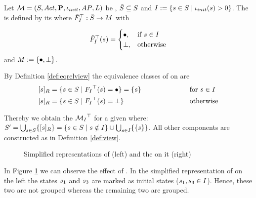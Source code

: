 \documentclass[preview]{standalone}
\begin{document}
\begin{definition}
	Let ${{{\mathcal{M}}}} = {{({S}, {Act}, {\textbf{P}}, {\iota_{init}}, {AP}, {L})}}$ be \achgphN, ${\tilde{{S}}} \subseteq {S}$ and ${I} := \{{s} \in {S} \mid {\iota_{init}}({s}) > 0\}$. The \viewN \viewinitstates is defined by its \grpfctN \gfctinitstates where ${{\tilde{F}_{{{I}}}}^{\top}} : {\tilde{{S}}} \to {\ensuremath{{M}}}$ with 
	
	\[
	{{\tilde{F}_{{{I}}}}^{\top}}({s}) =
	\begin{cases}
			{\bullet},				& \text{if } {s} \in {I} \\
			{\bot},     	& \text{otherwise}
		\end{cases}
	\]	
	and ${{M}} := {\{{\bullet}, {\bot}\}}$.
\end{definition}

\noindent By Definition \ref{def:eqrelview} the equivalence classes of \eqrelview on \states are 
\begin{alignat*}{3}
	\eqclassv &= \{\state \in \states \mid \gfctinitstates(\state) = \remelem\} = \{\state\} \quad\quad\quad\quad\quad\quad &&\text{for } \state \in \initstates \\
	\eqclassv &= \{\state \in \states \mid \gfctinitstates(\state) = \notppty \} &&\text{otherwise}
\end{alignat*}

\noindent Thereby we obtain the \viewN ${{{{{\mathcal{M}}}}_{{{I}}}}^{\top}}$ for a given \achgphN \chgph where: ${S}' = \bigcup_{{s} \in {S}} \{{{[{s}]_{{R}}}}\} = \{{s} \in {S} \mid {s} \notin {I}\}\cup \bigcup_{{s} \in {I}}\{\{{s}\}\}$. All other components are constructed as in Definition \ref{def:view}.

\begin{figure}[!htb]
	\begin{minipage}{.5\textwidth}
		\hspace{5mm}
		
	\end{minipage}%
	\begin{minipage}{.5\textwidth}
		
	\end{minipage}
	\caption{Simplified representations of \mdp (left) and the \viewN \viewinitstates on it (right)}
	\label{fig:initStatesExmp} 
\end{figure}

\begin{exmp}
	In Figure \ref{fig:initStatesExmp} we can observe the effect of \viewinitstates. In the simplified representation of \achgphN on the left the states ${s}_1$ and ${s}_3$ are marked as initial states (${s}_1, {s}_3 \in {I}$). Hence, these two are not grouped whereas the remaining two are grouped.
\end{exmp}
\end{document}
